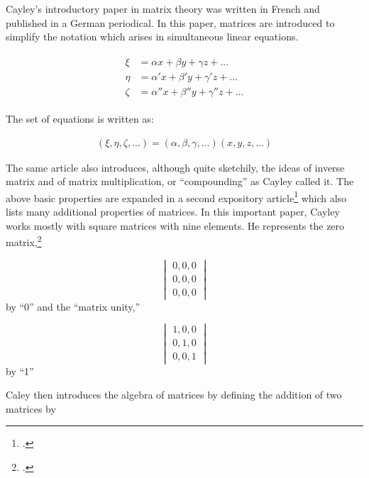 {{{Cayley's introductory paper in matrix theory was written in French and published in a German periodical. In this paper, matrices are introduced to simplify the notation which arises in simultaneous linear equations.  

\begin{gather}
\begin{aligned}
\xi  &= \alpha x + \beta y + \gamma z + \dots\\
\eta  &= \alpha' x + \beta' y + \gamma' z + \dots\\
\zeta &= \alpha'' x + \beta'' y + \gamma'' z + \dots
\end{aligned}
\end{gather}

The set of equations is written as:

\begin{gather}
(\xi, \eta, \zeta,\dots ) = (\alpha,\beta,\gamma,\dots)(x,y,z,\dots)
\end{gather}

The same article also introduces, although quite sketchily, the ideas of inverse matrix and of matrix multiplication, or \enquote{compounding} as Cayley called it. The above basic properties are expanded in a second expository article\footcite{fieldman1962} which
also lists many additional properties of matrices. In this important paper, Cayley works mostly with square matrices with
nine elements. He represents the zero matrix,\footcite[This is an interesting development]{fieldman1962}

\[
\begin{vmatrix}
0,0,0\\
0,0,0\\
0,0,0
\end{vmatrix}
\]
by \enquote{0} and the \enquote{matrix unity,}

\[
\begin{vmatrix}
1,0,0\\
0,1,0\\
0,0,1
\end{vmatrix}
\]
by \enquote{1}

Caley then introduces the algebra of matrices by defining the addition of two matrices by

}}}
